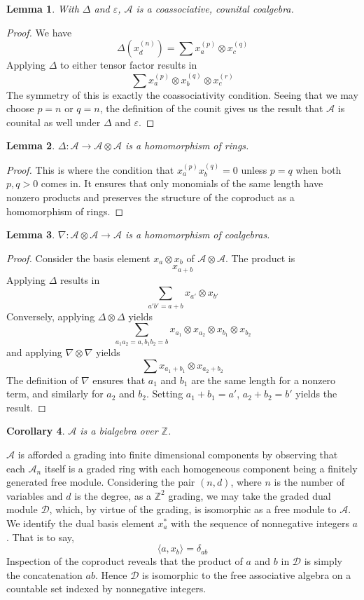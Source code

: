 \documentclass{amsart}
\newtheorem{lemma}{Lemma}[subsection]
\newtheorem{corollary}[lemma]{Corollary}
\theoremstyle{definition}
\theoremstyle{remark}
\numberwithin{equation}{subsection}
\newcommand{\coma}{\mathcal{A}}
\newcommand{\dcoma}{\mathcal{D}}
\begin{document}
\begin{lemma}
	With $\Delta$ and $\varepsilon$, $\coma$ is a coassociative, counital coalgebra.
\end{lemma}
\begin{proof}
	We have 
	$$\Delta(x_d^{(n)})=\sum x_a^{(p)}\otimes x_c^{(q)}$$
	Applying $\Delta$ to either tensor factor results in
	$$\sum x_a^{(p)}\otimes x_b^{(q)}\otimes x_c^{(r)}$$
	The symmetry of this is exactly the coassociativity condition. Seeing that we may choose $p=n$ or $q=n$, the definition of the counit gives us the result that $\coma$ is counital as well under $\Delta$ and $\varepsilon$.
\end{proof}

\begin{lemma}
	$\Delta:\coma\to\coma\otimes\coma$ is a homomorphism of rings.
\end{lemma}
\begin{proof}
	This is where the condition that $x_a^{(p)}x_b^{(q)}=0$ unless $p=q$ when both $p,q>0$ comes in. It ensures that only monomials of the same length have nonzero products and preserves the structure of the coproduct as a homomorphism of rings.
\end{proof}

\begin{lemma}
	$\nabla:\coma\otimes \coma\to \coma$ is a homomorphism of coalgebras.
\end{lemma}
\begin{proof}
  Consider the basis element $x_a\otimes x_b$ of $\coma\otimes \coma$. The product is
  $$x_{a+b}$$
  Applying $\Delta$ results in
$$\sum_{a'b'=a+b} x_{a'}\otimes x_{b'}$$
Conversely, applying $\Delta\otimes \Delta$ yields
$$\sum_{a_1a_2=a,b_1b_2=b}x_{a_1}\otimes x_{a_2}\otimes x_{b_1}\otimes x_{b_2}$$
and applying $\nabla\otimes \nabla$ yields
$$\sum x_{a_1 + b_1}\otimes x_{a_2 + b_2}$$
The definition of $\nabla$ ensures that $a_1$ and $b_1$ are the same length for a nonzero term, and similarly for $a_2$ and $b_2$. Setting $a_1+b_1=a'$, $a_2+b_2=b'$ yields the result.
\end{proof}

\begin{corollary}
	$\coma$ is a bialgebra over $\mathbb{Z}$.
\end{corollary}

$\coma$ is afforded a grading into finite dimensional components by observing that each $\coma_n$ itself is a graded ring with each homogeneous component being a finitely generated free module. Considering the pair $(n, d)$, where $n$ is the number of variables and $d$ is the degree, as a $\mathbb{Z}^2$ grading, we may take the graded dual module $\dcoma$, which, by virtue of the grading, is isomorphic as a free module to $\coma$. We identify the dual basis element $x_a^*$ with the sequence of nonnegative integers $a$. That is to say,
$$\langle a, x_b\rangle = \delta_{ab}$$
Inspection of the coproduct reveals that the product of $a$ and $b$ in $\dcoma$ is simply the concatenation $ab$. Hence $\dcoma$ is isomorphic to the free associative algebra on a countable set indexed by nonnegative integers.
\end{document}
